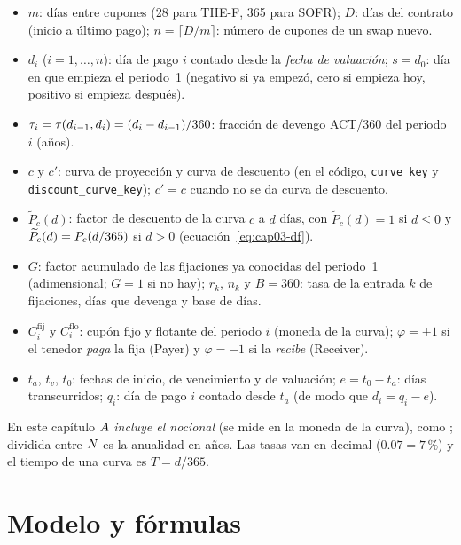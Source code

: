 \begin{itemize}
  \item $m$: días entre cupones (28 para TIIE-F, 365 para SOFR); $D$: días del contrato (inicio a último
        pago); $n=\lceil D/m\rceil$: número de cupones de un swap nuevo.
  \item $d_i$ ($i=1,\dots,n$): día de pago $i$ contado desde la \emph{fecha de valuación}; $s=d_0$: día en
        que empieza el periodo~1 (negativo si ya empezó, cero si empieza hoy, positivo si empieza después).
  \item $\tau_i=\tau(d_{i-1},d_i)=(d_i-d_{i-1})/360$: fracción de devengo ACT/360 del periodo $i$ (años).
  \item $c$ y $c'$: curva de proyección y curva de descuento (en el código, \texttt{curve\_key} y
        \texttt{discount\_curve\_key}); $c'=c$ cuando no se da curva de descuento.
  \item $\widetilde P_c(d)$: factor de descuento de la curva $c$ a $d$ días, con
        $\widetilde P_c(d)=1$ si $d\le0$ y $\widetilde P_c(d)=P_{c}(d/365)$ si $d>0$ (ecuación~\eqref{eq:cap03-df}).
  \item $G$: factor acumulado de las fijaciones ya conocidas del periodo~1 (adimensional; $G=1$ si no hay);
        $r_k$, $n_k$ y $B=360$: tasa de la entrada $k$ de fijaciones, días que devenga y base de días.
  \item $C^{\mathrm{fij}}_i$ y $C^{\mathrm{flo}}_i$: cupón fijo y flotante del periodo $i$ (moneda de la curva);
        $\varphi=+1$ si el tenedor \emph{paga} la fija (Payer) y $\varphi=-1$ si la \emph{recibe} (Receiver).
  \item $t_a$, $t_v$, $t_0$: fechas de inicio, de vencimiento y de valuación; $e=t_0-t_a$: días transcurridos;
        $q_i$: día de pago $i$ contado desde $t_a$ (de modo que $d_i=q_i-e$).
\end{itemize}

En este capítulo $A$ \emph{incluye el nocional} (se mide en la moneda de la curva), como
; dividida entre $N$ es la anualidad en años. Las
tasas van en decimal ($0.07=7\,\%$) y el tiempo de una curva es $T=d/365$.

\section{Modelo y fórmulas}\label{sec:cap03-modelo}


